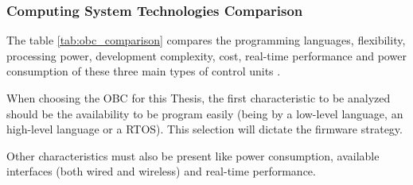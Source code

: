 \subsubsection{Computing System Technologies Comparison}
The table \ref{tab:obc_comparison} compares the programming languages, flexibility, processing power, development complexity, cost, real-time performance and power consumption of these three main types of control units \cite{OBC5}.
\begin{table}[H]
    \centering
    \caption{Comparison of Microcontrollers, Microprocessors, and FPGAs.}
    \label{tab:obc_comparison}
\end{table}

When choosing the \gls{OBC} for this Thesis, the first characteristic to be analyzed should be the availability to be program easily (being by a low-level language, an high-level language or a \gls{RTOS}).
This selection will dictate the firmware strategy.

Other characteristics must also be present like power consumption, available interfaces (both wired and wireless) and real-time performance.

